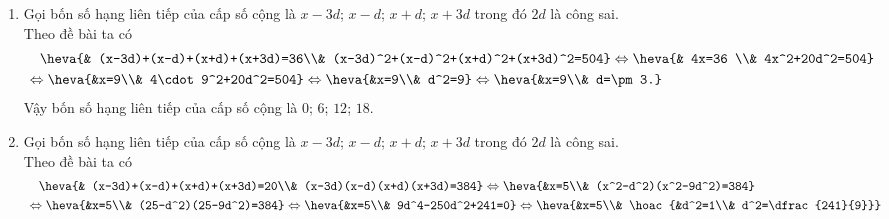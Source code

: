 \begin{bt}[VD]
{\begin{enumerate}
			Theo đề bài ta có 
			\begin{align*}
				&\quad \heva{& (x-3d)+(x-d)+(x+d)+(x+3d)=22\\& (x-3d)^2+(x-d)^2+(x+d)^2+(x+3d)^2=66}
				\Leftrightarrow \heva{& 4x=22 \\& 4x^2+20d^2=66}\\
				&\Leftrightarrow  \heva{&x=\dfrac{11}{2}\\& 4\cdot \left( \dfrac{11}{2}\right) ^2+20d^2=66}
				\Leftrightarrow  \heva{&x=\dfrac{11}{2}\\& d^2=\dfrac{-11}{4} 
					\ (\text{loại}).}\\
			\end{align*}
			Vậy không tồn tại bốn số hạng liên tiếp của cấp số cộng thỏa mãn yêu cầu đề bài.
			\item Gọi bốn số hạng liên tiếp của cấp số cộng là $x-3d$; $x-d$; $x+d$; $x+3d$ trong đó $2d$ là công sai.\\
			Theo đề bài ta có 
			\begin{align*}
				&\quad \heva{& (x-3d)+(x-d)+(x+d)+(x+3d)=36\\& (x-3d)^2+(x-d)^2+(x+d)^2+(x+3d)^2=504}
				\Leftrightarrow \heva{& 4x=36 \\& 4x^2+20d^2=504}\\
				&\Leftrightarrow  \heva{&x=9\\& 4\cdot 9^2+20d^2=504}
				\Leftrightarrow  \heva{&x=9\\& d^2=9}
				\Leftrightarrow  \heva{&x=9\\& d=\pm 3.}
			\end{align*}
			Vậy  bốn  số hạng liên tiếp của cấp số cộng là $0$; $ 6$; $ 12$; $18$.
			\item Gọi bốn số hạng liên tiếp của cấp số cộng là $x-3d$; $x-d$; $x+d$; $x+3d$ trong đó $2d$ là công sai.\\
			Theo đề bài ta có 
			\begin{align*}
				&\quad \heva{& (x-3d)+(x-d)+(x+d)+(x+3d)=20\\& (x-3d)(x-d)(x+d)(x+3d)=384}
				\Leftrightarrow  \heva{&x=5\\& (x^2-d^2)(x^2-9d^2)=384}\\
				&\Leftrightarrow  \heva{&x=5\\& (25-d^2)(25-9d^2)=384}
				\Leftrightarrow  \heva{&x=5\\& 9d^4-250d^2+241=0}
				\Leftrightarrow  \heva{&x=5\\& \hoac{&d^2=1\\& d^2=\dfrac{241}{9}}}

\end{align*}
\end{enumerate}}
\end{bt}
